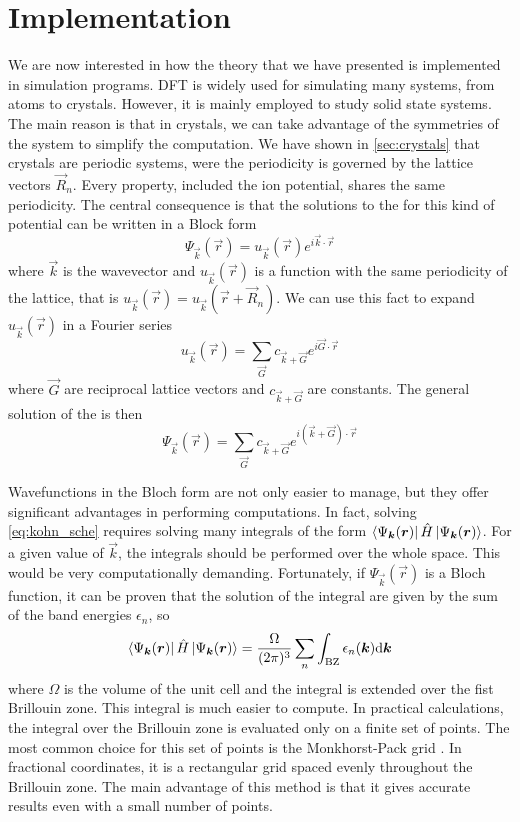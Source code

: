 \section{Implementation} \label{sec:implementation}
We are now interested in how the theory that we have presented is implemented in simulation programs. DFT is widely used for simulating many systems, from atoms to crystals. However, it is mainly employed to study solid state systems. The main reason is that in crystals, we can take advantage of the symmetries of the system to simplify the computation. We have shown in \cref{sec:crystals} that crystals are periodic systems, were the periodicity is governed by the lattice vectors $\vec{R}_n$. Every property, included the ion potential, shares the same periodicity. The central consequence is that the solutions to the \sche for this kind of potential can be written in a Block form
\begin{equation}
    \Psi_{\vec{k}}(\vec{r}) = u_{\vec{k}}(\vec{r}) e^{i\vec{k}\cdot\vec{r}}
\end{equation}
where $\vec{k}$ is the wavevector and $u_{\vec{k}}(\vec{r})$ is a function with the same periodicity of the lattice, that is $u_{\vec{k}}(\vec{r}) = u_{\vec{k}}(\vec{r}+\vec{R}_n)$. We can use this fact to expand $u_{\vec{k}}(\vec{r})$ in a Fourier series
\begin{equation}
    u_{\vec{k}}(\vec{r}) = \sum_\vec{G} c_{\vec{k}+\vec{G}} e^{i\vec{G}\cdot\vec{r}}
\end{equation}
where $\vec{G}$ are reciprocal lattice vectors and $c_{\vec{k}+\vec{G}}$ are constants. The general solution of the \sche is then
\begin{equation} \label{eq:sum_bloch}
    \Psi_{\vec{k}}(\vec{r}) = \sum_\vec{G} c_{\vec{k}+\vec{G}} e^{i(\vec{k}+\vec{G})\cdot\vec{r}}
\end{equation}

Wavefunctions in the Bloch form are not only easier to manage, but they offer significant advantages in performing computations. In fact, solving \cref{eq:kohn_sche} requires solving many integrals of the form $\bra{\Psi_{\mathbf{\boldsymbol{k}}}(\mathbf{\boldsymbol{r}})} \hat{H} \ket{\Psi_{\mathbf{\boldsymbol{k}}}(\mathbf{\boldsymbol{r}})}$. For a given value of $\vec{k}$, the integrals should be performed over the whole space. This would be very computationally demanding. Fortunately, if $\Psi_{\vec{k}}(\vec{r})$ is a Bloch function, it can be proven that the solution of the integral are given by the sum of the band energies $\epsilon_n$, so
\begin{equation}
    \bra{\Psi_{\vec{k}}(\vec{r})} \oper{H} \ket{\Psi_{\vec{k}}(\vec{r})} = \frac{\Omega}{(2\pi)^3} \sum_n \int_\text{BZ} \epsilon_n(\vec{k})\differential \vec{k}
\end{equation}
where $\Omega$ is the volume of the unit cell and the integral is extended over the fist Brillouin zone. This integral is much easier to compute. In practical calculations, the integral over the Brillouin zone is evaluated only on a finite set of points. The most common choice for this set of points is the Monkhorst-Pack grid \cite{monkhorst1976}. In fractional coordinates, it is a rectangular grid spaced evenly throughout the Brillouin zone. The main advantage of this method is that it gives accurate results even with a small number of points.

